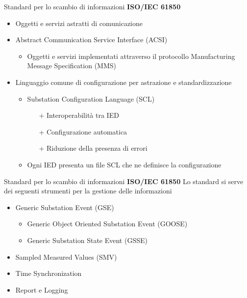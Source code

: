 \begin{frame}{Standard per lo scambio di informazioni}
\textbf{ISO/IEC 61850}
	\begin{itemize}[<+- | alert@+>]
		\item Oggetti e servizi astratti di comunicazione %
		\item Abstract Communication Service Interface (ACSI)
			\begin{itemize}[<+- | alert@+>]
				\item Oggetti e servizi implementati attraverso il protocollo Manufacturing Message Specification (MMS) %
			\end{itemize}
		\item Linguaggio comune di configurazione per astrazione e standardizzazione
		\begin{itemize}[<+- | alert@+>]
			\item Substation Configuration Language (SCL)%
			\begin{itemize}[<+- | alert@+>]
			\item[+] Interoperabilità tra IED
			\item[+] Configurazione automatica
			\item[+] Riduzione della presenza di errori
			\end{itemize}
			\item Ogni IED presenta un file SCL che ne definisce la configurazione
		\end{itemize}
	\end{itemize}		
\end{frame}


\begin{frame}{Standard per lo scambio di informazioni}
\textbf{ISO/IEC 61850}
\newline
Lo standard si serve dei seguenti strumenti per la gestione delle informazioni
\begin{itemize}[<+- | alert@+>]
	\item Generic Substation Event (GSE)
	\begin{itemize}[<+- | alert@+>]
		\item Generic Object Oriented Substation Event (GOOSE)
		\item Generic Substation State Event (GSSE)
	\end{itemize}
	\item Sampled Measured Values (SMV)
	\item Time Synchronization
	\item Report e Logging
\end{itemize}
\end{frame}

